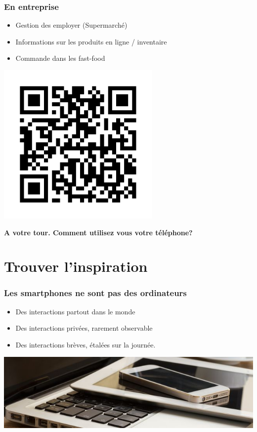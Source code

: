 \documentclass{beamer}
\begin{document}
\begin{frame}
\frametitle{En entreprise}

\begin{itemize}
	\item Gestion des employer (Supermarché)
	\item Informations sur les produits en ligne / inventaire
	\item Commande dans les fast-food
\end{itemize}


\begin{center}
\includegraphics[scale=0.6]{qrcode.png}
\end{center}
\end{frame}

\begin{frame}
\begin{center}
\textbf{A votre tour. Comment utilisez vous votre téléphone?}
\end{center}
\end{frame}

\section{Trouver l'inspiration}

\begin{frame}
\frametitle{Les smartphones ne sont pas des ordinateurs}

\begin{itemize}
	\item Des interactions partout dans le monde
	\item Des interactions privées, rarement observable
	\item Des interactions brèves, étalées sur la journée.
\end{itemize}

\begin{center}
\includegraphics[scale=1]{tel-tab-lap.jpg}
\end{center}
\end{frame}
\end{document}
